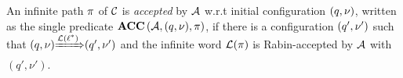 \vspace{-1em}
\begin{definition}\label{def:fnacc}
An infinite path $\pi$ of $\mathcal{C}$ is \emph{accepted} by $\mathcal{A}$ w.r.t
initial configuration $(q,\nu)$, written as the single predicate $\mbox{\bf ACC} \left( {\mathcal{A}}, {(q,\nu)}, {\pi} \right)$,
if there is a configuration $(q',\nu')$ such that ${(q,\nu)}{\xRightarrow{\mathcal{L}(\ell^*)}}{(q',\nu')}$ and
the infinite word $\mathcal{L}(\pi)$ is Rabin-accepted by $\mathcal{A}$ with
$
\left(q',\nu'\right)
$.
\end{definition}

